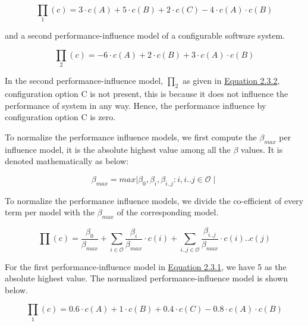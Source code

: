 \begin{equation*}
  \prod_1{(c)} = 3 \cdot c(A) + 5  \cdot c(B) + 2 \cdot c(C) - 4 \cdot  c(A) \cdot c(B)
   \tag{2.3.1}\label{eq:2.3.1}
\end{equation*}

and a second performance-influence model of a configurable software system.

\begin{equation*}
  \prod_2{(c)} = -6 \cdot c(A) + 2  \cdot c(B) + 3 \cdot  c(A) \cdot c(B)
   \tag{2.3.2}\label{eq:2.3.2}
\end{equation*}

In the second performance-influence model, $\prod_2$ as given in \hyperref[eq:2.3.2]{Equation 2.3.2}, configuration option C is not present, this is because it does not influence the performance of system in any way. Hence, the performance influence by configuration option C is zero.

To normalize the performance influence models, we first compute the $\beta_{max}$ per influence model, it is the absolute highest value among all the $\beta$ values. It is denoted mathematically as below:

\begin{equation*}
     \beta_{max} = max { \mid \beta_{0} , \beta_{\textit{i}} ,  \beta_{\textit{i..j}} :  {i, i..j \in \mathcal{O}}  \mid }
  \tag{2.3.3}\label{eq:2.3.3} 
\end{equation*}

To normalize the performance influence models, we divide the co-efficient of every term per model with the $\beta_{max}$ of the corresponding model.

\begin{equation*}
  \prod {(c)} = \frac{\beta_{\mathrm{0}}}{\beta_{max}}  + \sum_{i \in \mathcal{O}} \frac{\beta_{\textit{i}}}{\beta_{max}} \cdot {c(i)} + 
 \sum_{i..j \in \mathcal{O}} 
 \frac{\beta_{\textit{i..j}}}{\beta_{max}} \cdot c(i)..c(j)
  \tag{2.3.4}\label{eq:2.3.4} 
\end{equation*}

For the first performance-influence model in \hyperref[eq:2.3.1]{Equation 2.3.1}, we have 5 as the absolute highest value. The normalized performance-influence model is shown below.

\begin{equation*}
  \prod_1{(c)} = 0.6 \cdot c(A) + 1  \cdot c(B) + 0.4 \cdot c(C) - 0.8 \cdot  c(A) \cdot c(B)
   \tag{2.3.5}\label{eq:2.3.5}
\end{equation*}

